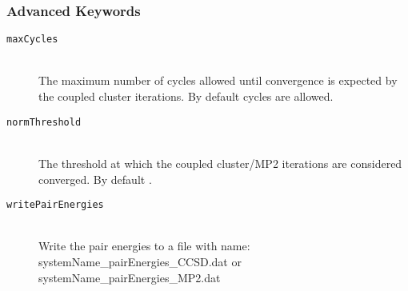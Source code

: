 \subsubsection{Advanced Keywords}
\begin{description}
  \item [\texttt{maxCycles}]\hfill \\
  The maximum number of cycles allowed until convergence is expected by the coupled cluster iterations.
  By default  cycles are allowed.
  \item [\texttt{normThreshold}]\hfill \\
  The threshold at which the coupled cluster/MP2 iterations are considered converged. By default .
  \item [\texttt{writePairEnergies}]\hfill \\
  Write the pair energies to a file with name: systemName\_pairEnergies\_CCSD.dat or systemName\_pairEnergies\_MP2.dat
\end{description}
